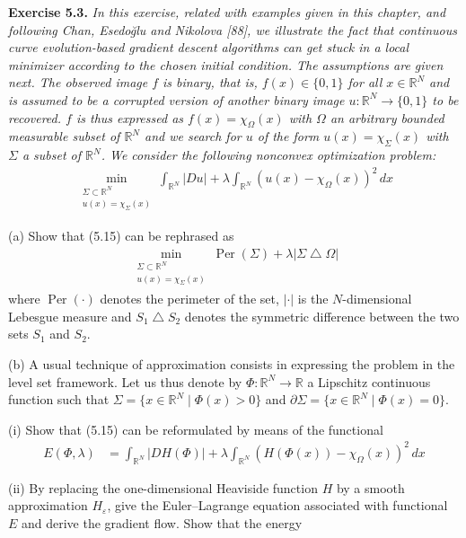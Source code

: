 \documentclass[12pt,letterpaper]{article}
\newcommand{\R}{\mathbb R}
\newcommand{\eps}{\varepsilon}
\newcommand{\exercise}[1]{%
  \par\bigskip\noindent\textbf{Exercise #1.}\enspace}
\newenvironment{statement}{\itshape\ignorespaces}{\par}
\begin{document}
\clearpage
\exercise{5.3}
\begin{statement}
In this exercise, related with examples given in this chapter, and
following Chan, Esedo\u{g}lu and Nikolova [88], we illustrate the fact
that continuous curve evolution-based gradient descent algorithms can
get stuck in a local minimizer according to the chosen initial condition.
The assumptions are given next. The observed image $f$ is binary, that is,
$f(x)\in\{0,1\}$ for all $x\in\R^N$ and is assumed to be a corrupted
version of another binary image $u:\R^N\to\{0,1\}$ to be recovered.
$f$ is thus expressed as $f(x)=\chi_\Omega(x)$ with $\Omega$ an arbitrary
bounded measurable subset of $\R^N$ and we search for $u$ of the form
$u(x)=\chi_\Sigma(x)$ with $\Sigma$ a subset of $\R^N$. We consider the
following nonconvex optimization problem:
\begin{align*}
 \min_{\substack{\Sigma\subset\R^N\\u(x)=\chi_\Sigma(x)}}
 \int_{\R^N}|Du|+\lambda\int_{\R^N}
       (u(x)-\chi_\Omega(x))^2\,dx
 \tag{5.15}
\end{align*}
\par\smallskip
(a) Show that (5.15) can be rephrased as
\begin{align*}
 \min_{\substack{\Sigma\subset\R^N\\u(x)=\chi_\Sigma(x)}}
 \operatorname{Per}(\Sigma)+\lambda|\Sigma\mathbin\triangle\Omega|
\end{align*}
where $\operatorname{Per}(\cdot)$ denotes the perimeter of the set,
$|\cdot|$ is the $N$-dimensional Lebesgue measure and
$S_1\mathbin\triangle S_2$ denotes the symmetric difference between
the two sets $S_1$ and $S_2$.
\par\smallskip
(b) A usual technique of approximation consists in expressing the problem
in the level set framework. Let us thus denote by $\Phi:\R^N\to\R$ a
Lipschitz continuous function such that
$\Sigma=\{x\in\R^N\mid\Phi(x)>0\}$ and
$\partial\Sigma=\{x\in\R^N\mid\Phi(x)=0\}$.
\par\smallskip
(i) Show that (5.15) can be reformulated by means of the functional
\begin{align*}
 E(\Phi,\lambda)
 &=\int_{\R^N}|DH(\Phi)|
   +\lambda\int_{\R^N}(H(\Phi(x))-\chi_\Omega(x))^2\,dx
\end{align*}
\par\smallskip
(ii) By replacing the one-dimensional Heaviside function $H$ by a smooth
approximation $H_\eps$, give the Euler--Lagrange equation associated with
functional $E$ and derive the gradient flow. Show that the energy

\end{statement}
\end{document}
